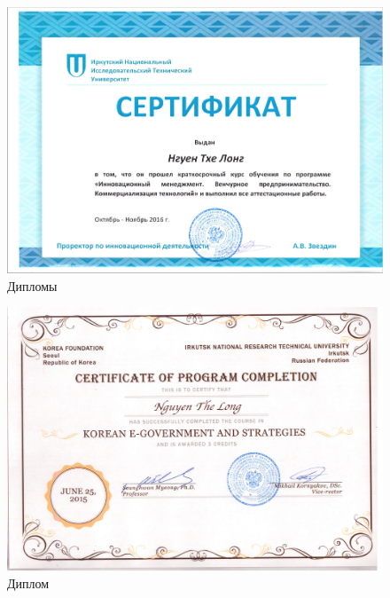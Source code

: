 \begin{figure}[ht!]
\centering
\includegraphics [scale=0.6] {images/p30.png}
\begin{center}
\caption{Дипломы}\label{img45}
\end{center}
\end{figure}

\begin{figure}[ht!]
\centering
\includegraphics [scale=0.5] {images/p26.png}
\begin{center}
\caption{Диплом}\label{imgp26}
\end{center}
\end{figure}